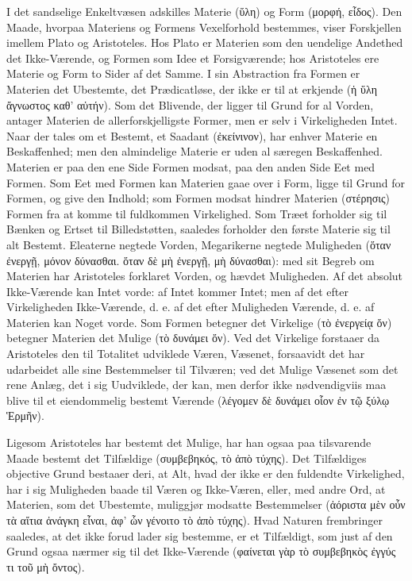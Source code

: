 \documentclass[12pt]{book}
\newcommand{\opage}[1]{\marginnote{\footnotesize\textit{[#1]}}}
\begin{document}
I det sandselige Enkeltvæsen adskilles Materie (ὕλη) og Form (μορφή, εἶδος). Den Maade, hvorpaa
Materiens og Formens Vexelforhold bestemmes, viser Forskjellen imellem Plato og Aristoteles. Hos
Plato er Materien som den uendelige Andethed det Ikke-Værende, og Formen som Idee et
Forsigværende; hos Aristoteles ere Materie og Form to Sider af det Samme. I sin Abstraction fra
Formen er Materien det Ubestemte, det Prædicatløse, der ikke er til at erkjende (ἡ ὕλη ἄγνωστος
καθ' αὑτήν). Som det Blivende, der ligger til Grund for al Vorden, antager Materien de
allerforskjelligste Former, men er selv i Virkeligheden Intet. Naar der tales om et Bestemt, et
Saadant (ἐκείνινον), har enhver Materie en Beskaffenhed; men den almindelige Materie er uden al
særegen Beskaffenhed. Materien er paa den ene Side Formen modsat, paa den anden Side Eet med
Formen. Som Eet med Formen kan Materien gaae over i Form, ligge til Grund for Formen, og give den
Indhold; som Formen modsat hindrer Materien (στέρησις) Formen fra at komme til fuldkommen
Virkelighed.
\opage{141} Som Træet forholder sig til Bænken og Ertset til Billedstøtten, saaledes forholder den første
Materie sig til alt Bestemt. Eleaterne negtede Vorden, Megarikerne negtede Muligheden (ὅταν
ἐνεργῇ, μόνον δύνασθαι. ὅταν δὲ μὴ ἐνεργῇ, μὴ δύνασθαι): med sit Begreb om Materien har Aristoteles
forklaret Vorden, og hævdet Muligheden. Af det absolut Ikke-Værende kan Intet vorde: af Intet
kommer Intet; men af det efter Virkeligheden Ikke-Værende, d. e. af det efter Muligheden Værende,
d. e. af Materien kan Noget vorde. Som Formen betegner det Virkelige (τὸ ἐνεργείᾳ ὄν) betegner
Materien det Mulige (τὸ δυνάμει ὄν). Ved det Virkelige forstaaer da Aristoteles den til Totalitet
udviklede Væren, Væsenet, forsaavidt det har udarbeidet alle sine Bestemmelser til Tilværen; ved
det Mulige Væsenet som det rene Anlæg, det i sig Uudviklede, der kan, men derfor ikke
nødvendigviis maa blive til et eiendommelig bestemt Værende (λέγομεν δὲ δυνάμει οἷον ἐν τῷ ξύλῳ
Ἑρμῆν).

Ligesom Aristoteles har bestemt det Mulige, har han ogsaa paa tilsvarende Maade bestemt det
Tilfældige (συμβεβηκός, τὸ ἀπὸ τύχης). Det Tilfældiges objective Grund bestaaer deri, at Alt, hvad
der ikke er den fuldendte Virkelighed, har i sig Muligheden baade til Væren og Ikke-Væren, eller,
med andre Ord, at Materien, som det Ubestemte, muliggjør modsatte Bestemmelser (ἀόριστα μὲν οὖν
τὰ αἴτια ἀνάγκη εἶναι, ἀφ' ὧν γένοιτο τὸ ἀπὸ τύχης). Hvad Naturen frembringer saaledes, at det
ikke forud lader sig bestemme, er et Tilfældigt, som just af den Grund ogsaa nærmer sig til det
Ikke-Værende (φαίνεται γὰρ τὸ συμβεβηκὸς ἐγγύς τι τοῦ μὴ ὄντος).
\end{document}
